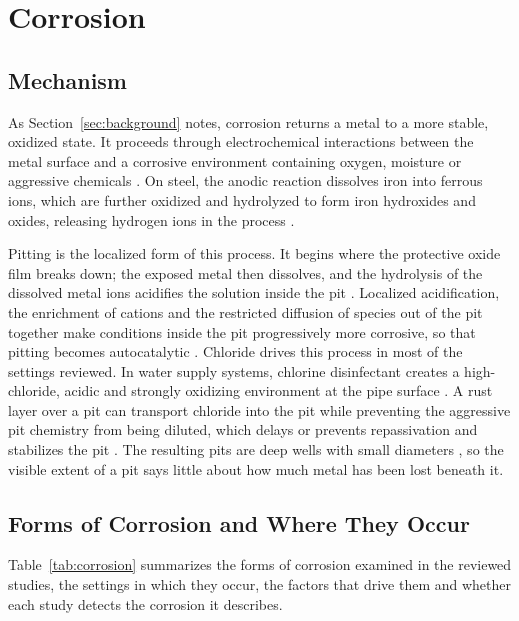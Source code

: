 \section{Corrosion}
\label{sec:lr-corrosion}

\subsection{Mechanism}

As Section~\ref{sec:background} notes, corrosion returns a metal to a more
stable, oxidized state. It proceeds through electrochemical interactions between the metal surface and a corrosive
environment containing oxygen, moisture or aggressive chemicals \citep{Alvani2026}. On steel,
the anodic reaction dissolves iron into ferrous ions, which are further oxidized
and hydrolyzed to form iron hydroxides and oxides, releasing hydrogen ions in the
process \citep{Liu2026}.

Pitting is the localized form of this process. It begins where the protective
oxide film breaks down; the exposed metal then dissolves, and the hydrolysis of
the dissolved metal ions acidifies the solution inside the pit \citep{Liu2026}. Localized
acidification, the enrichment of cations and the restricted diffusion of species
out of the pit together make conditions inside the pit progressively more
corrosive, so that pitting becomes autocatalytic \citep{Liu2026}. Chloride drives this
process in most of the settings reviewed. In water supply systems, chlorine
disinfectant creates a high-chloride, acidic and strongly oxidizing environment
at the pipe surface \citep{Li2022}. A rust layer over a pit can transport chloride into
the pit while preventing the aggressive pit chemistry from being diluted, which
delays or prevents repassivation and stabilizes the pit \citep{Nguyen2026}. The resulting pits
are deep wells with small diameters \citep{Soares2023}, so the visible extent of a pit says
little about how much metal has been lost beneath it.

\subsection{Forms of Corrosion and Where They Occur}

Table~\ref{tab:corrosion} summarizes the forms of corrosion examined in the
reviewed studies, the settings in which they occur, the factors that drive them
and whether each study detects the corrosion it describes.

